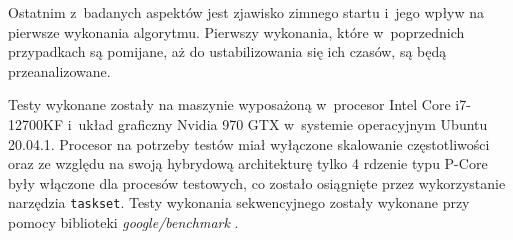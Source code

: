 Ostatnim z~badanych aspektów jest zjawisko zimnego startu i~jego wpływ na pierwsze wykonania algorytmu. Pierwszy wykonania, które w~poprzednich przypadkach są pomijane, aż do ustabilizowania się ich czasów, są będą przeanalizowane. 

Testy wykonane zostały na maszynie wyposażoną w~procesor Intel\textsuperscript{\tiny\textregistered} Core\textsuperscript{\tiny\texttrademark} i7-12700KF i~układ graficzny Nvidia 970 GTX w~systemie operacyjnym Ubuntu 20.04.1. Procesor na potrzeby testów miał wyłączone skalowanie częstotliwości oraz ze względu na swoją hybrydową architekturę tylko 4 rdzenie typu P-Core były włączone dla procesów testowych, co zostało osiągnięte przez wykorzystanie narzędzia \lstinline{taskset}. Testy wykonania sekwencyjnego zostały wykonane przy pomocy biblioteki \textit{google/benchmark} \cite{google-benchmark}.
